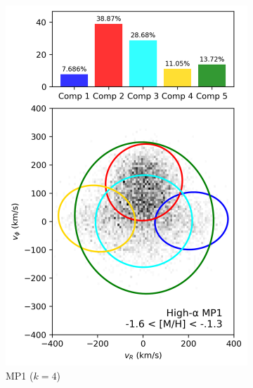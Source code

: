 \documentclass[a4paper,12pt]{article}
\begin{document}
\begin{figure}[ht]
\begin{subfigure}{0.245\linewidth}
    \includegraphics[width=\linewidth]{../figures/gmm_mp1_high_alpha_k4.png}
    \caption{MP1 ($k{=}4$)}
    \label{fig:mp1_hi}
  \end{subfigure}\hfill
  \begin{subfigure}{0.245\linewidth}

\end{subfigure}
\end{figure}
\end{document}
